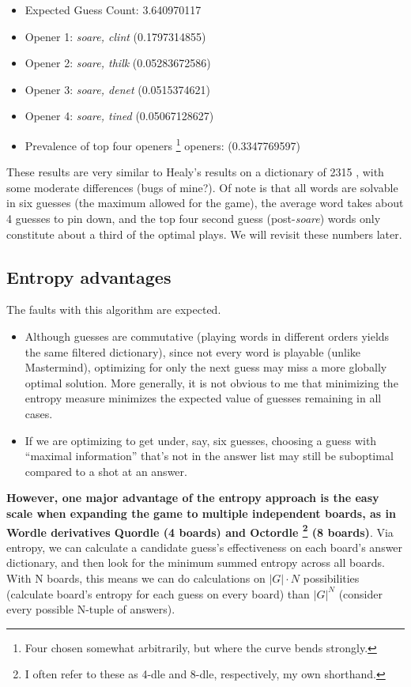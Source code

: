 \documentclass[11pt, oneside]{article} 	%
\begin{document}
\begin{itemize}
\item Expected Guess Count: 3.640970117
\item Opener 1: \emph{soare, clint} (0.1797314855)
\item Opener 2: \emph{soare, thilk} (0.05283672586)
\item Opener 3: \emph{soare, denet} (0.0515374621)
\item Opener 4: \emph{soare, tined} (0.05067128627)
\item Prevalence of top four openers \footnote{Four chosen somewhat arbitrarily, but where the curve bends strongly.} openers: (0.3347769597)
\end{itemize}

These results are very similar to Healy's results on a dictionary of 2315 \cite{1}, with some moderate differences (bugs of mine?). Of note is that all words are solvable in six guesses (the maximum allowed for the game), the average word takes about 4 guesses to pin down, and the top four second guess (post-\emph{soare}) words only constitute about a third of the optimal plays. We will revisit these numbers later.

\subsection{Entropy advantages}

The faults with this algorithm are expected. 
\begin{itemize}
\item Although guesses are commutative (playing words in different orders yields the same filtered dictionary), since not every word is playable (unlike Mastermind), optimizing for only the next guess may miss a more globally optimal solution. More generally, it is not obvious to me that minimizing the entropy measure minimizes the expected value of guesses remaining in all cases. 
\item If we are optimizing to get under, say, six guesses, choosing a guess with ``maximal information'' that's not in the answer list may still be suboptimal compared to a shot at an answer.
\end{itemize}

\textbf{However, one major advantage of the entropy approach is the easy scale when expanding the game to multiple independent boards, as in Wordle derivatives Quordle (4 boards) and Octordle \footnote{I often refer to these as 4-dle and 8-dle, respectively, my own shorthand.} (8 boards)}. Via entropy, we can calculate a candidate guess's effectiveness on each board's answer dictionary, and then look for the minimum summed entropy across all boards. With N boards, this means we can do calculations on $|G|\cdot N$ possibilities (calculate board's entropy for each guess on every board) than $|G|^N$ (consider every possible N-tuple of answers).
\end{document}
